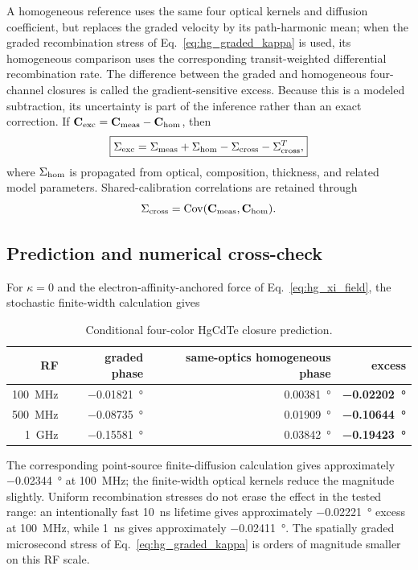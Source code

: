 \documentclass[11pt]{article}
\begin{document}
A homogeneous reference uses the same four optical kernels and diffusion coefficient, but replaces the graded velocity by its path-harmonic mean; when the graded recombination stress of Eq.~\eqref{eq:hg_graded_kappa} is used, its homogeneous comparison uses the corresponding transit-weighted differential recombination rate. The difference between the graded and homogeneous four-channel closures is called the gradient-sensitive excess. Because this is a modeled subtraction, its uncertainty is part of the inference rather than an exact correction. If $\mathbf C_{\rm exc}=\mathbf C_{\rm meas}-\mathbf C_{\rm hom}$, then
\begin{equation}
\boxed{\Sigma_{\rm exc}=\Sigma_{\rm meas}+\Sigma_{\rm hom}-\Sigma_{\rm cross}-\Sigma_{\rm cross}^{T},}
\label{eq:baseline_covariance}
\end{equation}
where $\Sigma_{\rm hom}$ is propagated from optical, composition, thickness, and related model parameters. Shared-calibration correlations are retained through
\begin{equation}
\Sigma_{\rm cross}=\operatorname{Cov}(\mathbf C_{\rm meas},\mathbf C_{\rm hom}).
\end{equation}

\subsection{Prediction and numerical cross-check}

For $\kappa=0$ and the electron-affinity-anchored force of Eq.~\eqref{eq:hg_xi_field}, the stochastic finite-width calculation gives
\begin{table}[H]
\centering
\caption{Conditional four-color HgCdTe closure prediction.}
\begin{tabular}{rrrr}
\toprule
RF & graded phase & same-optics homogeneous phase & excess \\
\midrule
\SI{100}{MHz} & \SI{-0.01821}{\degree} & \SI{+0.00381}{\degree} & \textbf{\SI{-0.02202}{\degree}} \\
\SI{500}{MHz} & \SI{-0.08735}{\degree} & \SI{+0.01909}{\degree} & \textbf{\SI{-0.10644}{\degree}} \\
\SI{1}{GHz} & \SI{-0.15581}{\degree} & \SI{+0.03842}{\degree} & \textbf{\SI{-0.19423}{\degree}} \\
\bottomrule
\end{tabular}
\label{tab:hgclosure}
\end{table}

The corresponding point-source finite-diffusion calculation gives approximately \SI{-0.02344}{\degree} at \SI{100}{MHz}; the finite-width optical kernels reduce the magnitude slightly. Uniform recombination stresses do not erase the effect in the tested range: an intentionally fast \SI{10}{ns} lifetime gives approximately \SI{-0.02221}{\degree} excess at \SI{100}{MHz}, while \SI{1}{ns} gives approximately \SI{-0.02411}{\degree}. The spatially graded microsecond stress of Eq.~\eqref{eq:hg_graded_kappa} is orders of magnitude smaller on this RF scale.
\end{document}
